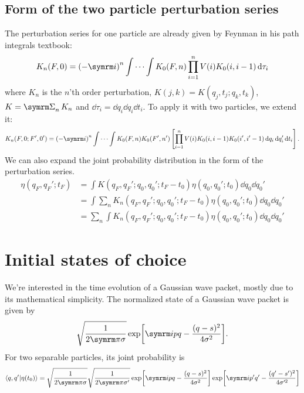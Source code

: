 \subsection{Form of the two particle perturbation series}

The perturbation series for one particle are already given by Feynman in his path integrals textbook:
\begin{equation}
    K_n(F, 0) = \left(-\im\right)^n\idotsint K_0(F, n)\prod_{i = 1}^n V(i)K_0(i, i - 1)\dd{\tau_i}
\end{equation}
where $K_n$ is the $n$'th order perturbation, $K(j, k) = K(q_j, t_j; q_k, t_k)$, $K = \ssum_nK_n$ and $\dd{\tau_i} = \dd{q_i}\dd{q_i}\dd{t_i}$. To apply it with two particles, we extend it:
\begin{equation}
    K_n(F, 0; F', 0') = \left(-\im\right)^n\idotsint K_0(F, n)K_0(F', n')\left[\prod_{i = 1}^nV(i)K_0(i, i - 1)K_0(i', i' - 1)\dd{q_i}\dd{q_i'}\dd{t_i}\right]. \label{eq:generaltwoparticleperturbation}
\end{equation}
We can also expand the joint probability distribution in the form of the perturbation series.
\begin{align}
    \eta(q_F, q_F'; t_F) &= \int K(q_F, q_F'; q_0, q_0'; t_F - t_0)\eta(q_0, q_0'; t_0)\dd{q_0}\dd{q_0'} \\
    &= \int \sum_n K_n(q_F, q_F'; q_0, q_0'; t_F - t_0)\eta(q_0, q_0'; t_0) \dd{q_0}\dd{q_0'} \\
    &= \sum_n \int K_n(q_F, q_F'; q_0, q_0'; t_F - t_0)\eta(q_0, q_0'; t_0) \dd{q_0}\dd{q_0'}
\end{align}

\section{Initial states of choice}
\label{sec:initial_states_of_choice}

We're interested in the time evolution of a Gaussian wave packet, mostly due to its mathematical simplicity. The normalized state of a Gaussian wave packet is given by
\begin{equation}
    \sqrt{\frac{1}{2\cpi\sigma}}\exp[\im p q - \frac{(q - s)^2}{4\sigma^2}]. \label{eq:unentangled_state}
\end{equation}
For two separable particles, its joint probability is
\begin{equation}
    \braket{q, q'}{\eta(t_0)} = \sqrt{\frac{1}{2\cpi\sigma}}\sqrt{\frac{1}{2\cpi\sigma'}}\exp[\im pq - \frac{(q - s)^2}{4\sigma^2}]\exp[\im p'q' - \frac{(q' - s')^2}{4\sigma'^2}]
\end{equation}

